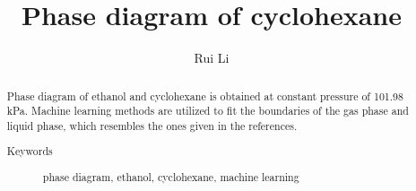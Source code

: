 \documentclass[%
 reprint,
 amsmath,amssymb,
 aps,
10.5pt,
]{revtex4-1}
\begin{document}

\title{Phase diagram of cyclohexane}%

\author{Rui Li}
%





\begin{abstract}
Phase diagram of ethanol and cyclohexane is obtained at constant pressure of 101.98 kPa. Machine learning methods are utilized to fit the boundaries of the gas phase and liquid phase, which resembles the ones given in the references.

\begin{description}
\item[Keywords]
phase diagram, ethanol, cyclohexane, machine learning
\end{description}
\end{abstract}

\maketitle
\end{document}
